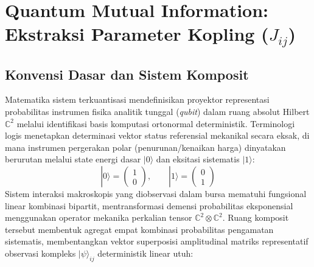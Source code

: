 \section{Quantum Mutual Information: Ekstraksi Parameter Kopling (\texorpdfstring{\(J_{ij}\)}{J\_ij})}\label{appendix-j}

\subsection{Konvensi Dasar dan Sistem Komposit}\label{konvensi-dasar-dan-sistem-komposit}
Matematika sistem terkuantisasi mendefinisikan proyektor representasi probabilitas instrumen fisika analitik tunggal (\emph{qubit}) dalam ruang absolut Hilbert $\mathbb{C}^2$ melalui identifikasi basis komputasi ortonormal deterministik. Terminologi logis menetapkan determinasi vektor status referensial mekanikal secara eksak, di mana instrumen pergerakan polar (penurunan/kenaikan harga) dinyatakan berurutan melalui state energi dasar $|0\rangle$ dan eksitasi sistematis $|1\rangle$:
\begin{equation}
|0\rangle = \begin{pmatrix} 1 \\ 0 \end{pmatrix}, \qquad |1\rangle = \begin{pmatrix} 0 \\ 1 \end{pmatrix}
\end{equation}
Sistem interaksi makroskopis yang diobservasi dalam bursa mematuhi fungsional linear kombinasi bipartit, mentransformasi demensi probabilitas eksponensial menggunakan operator mekanika perkalian tensor $\mathbb{C}^2 \otimes \mathbb{C}^2$. Ruang komposit tersebut membentuk agregat empat kombinasi probabilitas pengamatan sistematis, membentangkan vektor superposisi amplitudinal matriks representatif observasi kompleks $|\psi\rangle_{ij}$ deterministik linear utuh:
